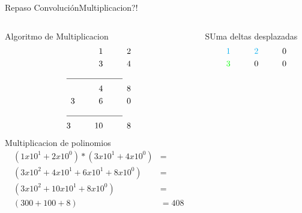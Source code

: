 \begin{frame}{Repaso Convolución}{Multiplicacion?!}
   \begin{columns}[t]
      \hspace{5pt}
   \begin{column}{.3\textwidth}
      \tiny
      Algoritmo de Multiplicacion
          \begin{align*}
               1\hspace{1cm} 2\\
               3\hspace{1cm} 4 \\
               \cline{1-2}
               4 \hspace{1cm} 8 \\
               3 \hspace{1cm} 6 \hspace{1cm}0 \\
               \cline{1-2}
               3 \hspace{1cm} 10 \hspace{1cm} 8\\
            \end{align*}
      Multiplicacion de polinomios
            \begin{align*}
               \left( 1 x10^1 + 2 x10^0 \right) * \left( 3 x10^1 + 4 x10^0 \right) &=  \\
               \left( 3 x10^2 + 4 x10^1 + 6 x10^1 + 8 x10^0\right) &=  \\
               \left( 3 x10^2 + 10 x10^1 + 8 x10^0\right) &=  \\
               \left( 300 + 100 + 8\right) &= 408
            \end{align*}
      \end{column}
      \hspace{2pt}
      \vrule
      \hspace{2pt}
      \begin{column}{.3\textwidth}
      \tiny
      SUma deltas desplazadas
            \begin{align*}
               \textcolor{cyan} {1} \hspace{1cm}\textcolor{cyan}{2} \hspace{1cm}0\\
               \textcolor{green}{3} \hspace{1cm}                 0  \hspace{1cm}0\\

\end{align*}
\end{column}
\end{columns}
\end{frame}
